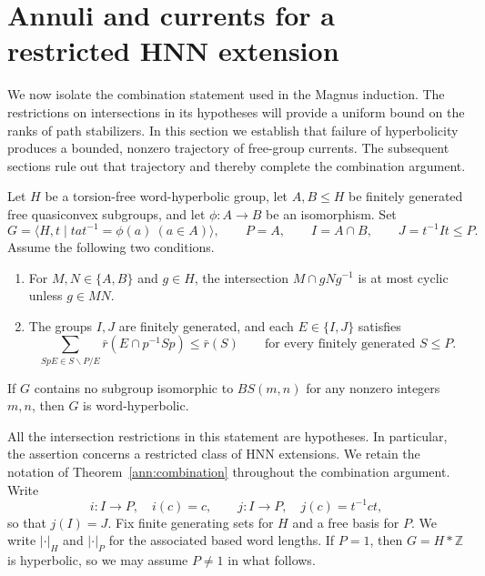 \section{Annuli and currents for a restricted HNN extension}
\label{ann:section}

We now isolate the combination statement used in the Magnus induction.
The restrictions on intersections in its hypotheses will provide a uniform
bound on the ranks of path stabilizers.  In this section we establish that
failure of hyperbolicity produces a bounded, nonzero trajectory of free-group
currents.  The subsequent sections rule out that trajectory and thereby
complete the combination argument.

\begin{theorem}
\label{ann:combination}
Let $H$ be a torsion-free word-hyperbolic group, let $A,B\leq H$ be
finitely generated free quasiconvex subgroups, and let $\phi\colon A\to B$
be an isomorphism.  Set
\[
 G=\langle H,t\mid tat^{-1}=\phi(a)\ (a\in A)\rangle,
 \qquad P=A,\qquad I=A\cap B,\qquad J=t^{-1}It\leq P.
\]
Assume the following two conditions.
\begin{enumerate}[label=\textup{(\roman*)}]
\item For $M,N\in\{A,B\}$ and $g\in H$, the intersection
      $M\cap gNg^{-1}$ is at most cyclic unless $g\in MN$.
\item The groups $I,J$ are finitely generated, and each $E\in\{I,J\}$
      satisfies
      \begin{equation}
      \sum_{SpE\in S\backslash P/E}
        \bar r(E\cap p^{-1}Sp)\leq\bar r(S)
      \qquad\text{for every finitely generated }S\leq P.
      \label{ann:inertia-assumption}
      \end{equation}
\end{enumerate}
If $G$ contains no subgroup isomorphic to $BS(m,n)$ for any nonzero
integers $m,n$, then $G$ is word-hyperbolic.
\end{theorem}

All the intersection restrictions in this statement are hypotheses.
In particular, the assertion concerns a restricted class of HNN
extensions.  We retain the notation of Theorem~\ref{ann:combination}
throughout the combination argument.  Write
\[
 i\colon I\longrightarrow P,\quad i(c)=c,
 \qquad
 j\colon I\longrightarrow P,\quad j(c)=t^{-1}ct,
\]
so that $j(I)=J$.  Fix finite generating sets for $H$ and a free basis
for $P$.  We write $|\cdot|_H$ and $|\cdot|_P$ for the associated based
word lengths.  If $P=1$, then $G=H*\mathbb Z$ is hyperbolic, so we may
assume $P\ne1$ in what follows.

